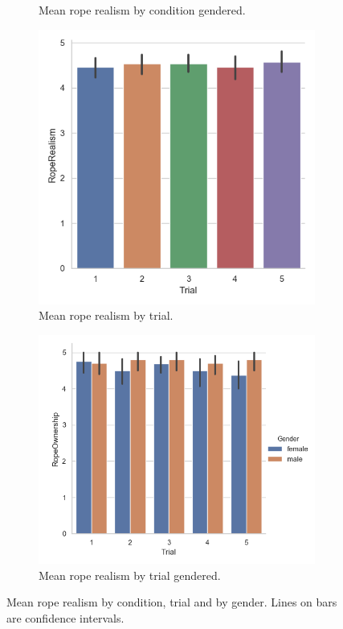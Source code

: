 \begin{figure}[H]
\begin{subfigure}[b]{0.5\textwidth}
     \caption{Mean rope realism by condition gendered.}
     \label{fig:ropeRealCondGend}
 \end{subfigure}
  \begin{subfigure}[b]{0.5\textwidth}
     \centering
     \includegraphics[scale=0.5]{Files/Plots/ropeRealism_by_trial.png}
     \caption{Mean rope realism by trial.}
     \label{fig:ropeRealTrial}
 \end{subfigure}
     \begin{subfigure}[b]{0.5\textwidth}
     \centering
     \includegraphics[scale=0.5]{Files/Plots/ropeOwnership_by_trial_gen.png}
     \caption{Mean rope realism by trial gendered.}
     \label{fig:ropeRealTrialGen}
 \end{subfigure}
     \caption{Mean rope realism by condition, trial and by gender. Lines on bars are confidence intervals.}
    \label{fig:ropeRealism}
\end{figure}
\clearpage

